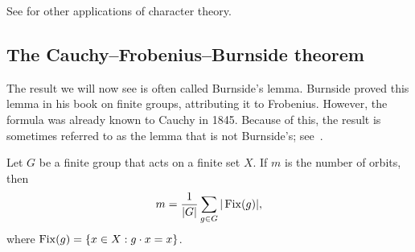 

See \cite{MR3821142} for other applications of character theory. 

\subsection{The Cauchy--Frobenius--Burnside theorem}

The result we will now see is often called Burnside’s lemma. Burnside proved this lemma in his book on finite groups, attributing it to Frobenius. However, the formula was already known to Cauchy in 1845. Because of this, the result is sometimes referred to as the lemma that is not Burnside’s; see~\cite{MR562002}.

\begin{theorem}
\label{thm:CFB}
    Let $G$ be a finite group that acts on a finite set $X$. 
    If $m$ is the number of orbits, then 
    \[
    m=\frac{1}{|G|}\sum_{g\in G}|\operatorname{Fix}(g)|,
    \]
    where $\operatorname{Fix}(g)=\{x\in X:g\cdot x=x\}$. 
\end{theorem}

